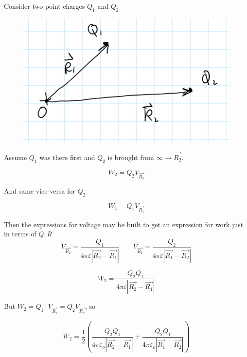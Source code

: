 \documentclass[10pt]{article}
\begin{document}
Consider two point charges $ Q_1 $ and $ Q_2 $

\begin{figure}[H]
	\centering
	\includegraphics[width=0.6\linewidth]{img/259_l17_point_charges.png}
\end{figure}

Assume $ Q_1 $ was there first and $ Q_2 $  is brought from $ \infty \rightarrow \vec{R_2} $.



\begin{equation}
	W_2 = Q_2 V_{\vec{R_2}}
\end{equation}

And same vice-versa for $ Q_2 $ 


\begin{equation}
	W_1 = Q_1 V_{\vec{R_1}}
\end{equation}

Then the expressions for voltage may be built to get an expression for work just in terms of $ Q, R$
\begin{equation}
	V_{\vec{R_2}} = \frac{Q_1}{4\pi \varepsilon |\vec{R_2} - \vec{R_1}| }  \qquad
V_{\vec{R_1}} = \frac{Q_2}{4\pi \varepsilon |\vec{R_1} - \vec{R_2}| }
\end{equation}

\begin{equation}
	W_2 =  \frac{Q_2Q_1}{4\pi \varepsilon |\vec{R_2} - \vec{R_1}| }
\end{equation}

But $ W_2 = Q_1 \cdot  V_{\vec{R_1}} = Q_2 V_{\vec{R_2}} $, so

\begin{equation}
	W_2 = \frac{1}{2} \left( 
	 \frac{Q_2Q_1}{4\pi \varepsilon_o |\vec{R_2} - \vec{R_1}| }+
	 \frac{Q_2Q_1}{4\pi \varepsilon_o |\vec{R_1} - \vec{R_2}| }
	\right)
\end{equation}
\end{document}
